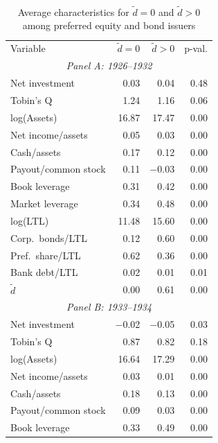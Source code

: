 \begin{table}[p]
\centering
\caption{\\ Average characteristics for $\tilde{d} = 0$ and $\tilde{d} > 0$ among preferred equity and bond issuers} \scriptsize \label{tab:sum_diff_pos}
    \begin{threeparttable}
        \begin{tabular}{lrrr}
            \toprule
            Variable & \ensuremath{\tilde{d}=0} & \ensuremath{\tilde{d}>0} & p-val. \\
            \multicolumn{4}{c}{\textit{Panel A: 1926--1932}} \\
            \midrule
            Net investment & 0.03 & 0.04 & 0.48 \\
            Tobin's Q & 1.24 & 1.16 & 0.06 \\
            log(Assets) & 16.87 & 17.47 & 0.00 \\
            Net income/assets & 0.05 & 0.03 & 0.00 \\
            Cash/assets & 0.17 & 0.12 & 0.00 \\
            Payout/common stock & 0.11 & $-$0.03 & 0.00 \\
            Book leverage & 0.31 & 0.42 & 0.00 \\
            Market leverage & 0.34 & 0.48 & 0.00 \\
            log(LTL) & 11.48 & 15.60 & 0.00 \\
            Corp.\ bonds/LTL & 0.12 & 0.60 & 0.00 \\
            Pref.\ share/LTL & 0.62 & 0.36 & 0.00 \\
            Bank debt/LTL & 0.02 & 0.01 & 0.01 \\
            \ensuremath{\tilde{d}} & 0.00 & 0.61 & 0.00 \\
            \midrule
            \multicolumn{4}{c}{\textit{Panel B: 1933--1934}} \\
            \midrule
            Net investment & $-$0.02 & $-$0.05 & 0.03 \\
            Tobin's Q & 0.87 & 0.82 & 0.18 \\
            log(Assets) & 16.64 & 17.29 & 0.00 \\
            Net income/assets & 0.03 & 0.01 & 0.00 \\
            Cash/assets & 0.18 & 0.13 & 0.00 \\
            Payout/common stock & 0.09 & 0.03 & 0.00 \\
            Book leverage & 0.33 & 0.49 & 0.00 \\

\end{tabular}
\end{threeparttable}
\end{table}
